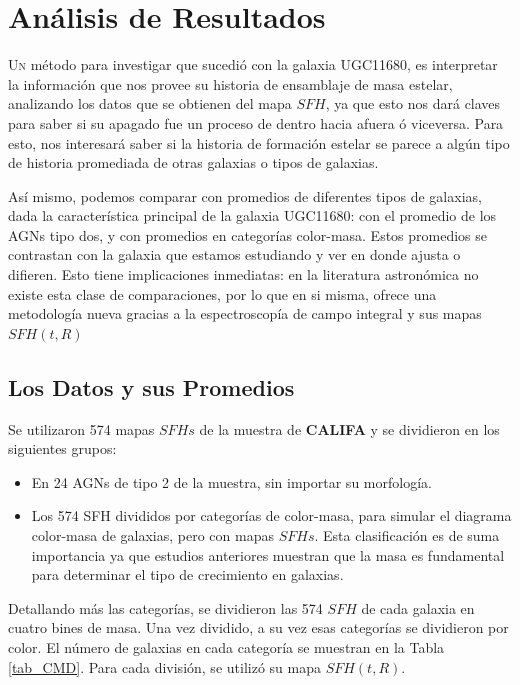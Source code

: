 \chapter{Análisis de Resultados}

\lettrine[lines=1]{U}n método para investigar que sucedió con la galaxia UGC11680, es interpretar
la información que nos provee su  historia de ensamblaje de masa estelar, analizando los datos que se obtienen del mapa $SFH$, ya que esto nos dará claves para saber si su apagado fue un proceso de dentro hacia afuera ó viceversa. Para esto, nos interesará saber si la historia de formación estelar se parece a algún tipo de historia  promediada de otras galaxias o tipos de galaxias.

\bigskip

\noindent Así mismo,  podemos comparar con promedios de diferentes tipos de galaxias, dada la característica principal de la galaxia UGC11680: con el promedio de los AGNs tipo dos, y con promedios en categorías color-masa. Estos promedios se contrastan con la galaxia que estamos estudiando y ver en donde ajusta o difieren.
Esto tiene implicaciones inmediatas: en la literatura astronómica no existe esta clase de comparaciones, por lo que en si misma, ofrece
una metodología nueva gracias a la espectroscopía de campo integral y sus mapas  $SFH(t,R)$

\section{Los Datos y sus Promedios}

\noindent Se utilizaron 574 mapas $SFHs$ de la muestra de \textbf{CALIFA} y se dividieron en los siguientes grupos:

\begin{itemize}

  \item En 24 AGNs de tipo 2 de la muestra, sin importar su morfología.

  \item Los 574 SFH divididos por categorías de color-masa, para simular el diagrama color-masa de galaxias, pero con mapas $SFHs$. Esta clasificación es de suma importancia ya que estudios anteriores muestran que la masa es fundamental para determinar el tipo de crecimiento en galaxias.

\end{itemize}

\noindent Detallando más las categorías, se dividieron las 574 $SFH$ de cada galaxia en cuatro bines de masa. Una vez dividido, a su vez esas categorías se dividieron por color. El número de galaxias en cada categoría se muestran en la Tabla \ref{tab_CMD}. Para cada división, se utilizó su mapa $SFH(t,R)$.

